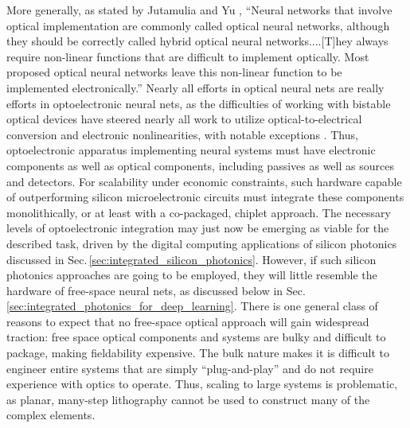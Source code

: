 More generally, as stated by Jutamulia and Yu \cite{juya1996}, ``Neural networks that involve optical implementation are commonly called optical neural networks, although they should be correctly called hybrid optical neural networks....[T]hey always require non-linear functions that are difficult to implement optically. Most proposed optical neural networks leave this non-linear function to be implemented electronically.'' Nearly all efforts in optical neural nets are really efforts in optoelectronic neural nets, as the difficulties of working with bistable optical devices \cite{ke1985} have steered nearly all work to utilize optical-to-electrical conversion and electronic nonlinearities, with notable exceptions \cite{prsh2017,more_refs_here}. Thus, optoelectronic apparatus implementing neural systems must have electronic components as well as optical components, including passives as well as sources and detectors. For scalability under economic constraints, such hardware capable of outperforming silicon microelectronic circuits must integrate these components monolithically, or at least with a co-packaged, chiplet approach. The necessary levels of optoelectronic integration may just now be emerging as viable for the described task, driven by the digital computing applications of silicon photonics discussed in Sec.\,\ref{sec:integrated_silicon_photonics}. However, if such silicon photonics approaches are going to be employed, they will little resemble the hardware of free-space neural nets, as discussed below in Sec.\,\ref{sec:integrated_photonics_for_deep_learning}. There is one general class of reasons to expect that no free-space optical approach will gain widespread traction: free space optical components and systems are bulky and difficult to package, making fieldability expensive. The bulk nature makes it is difficult to engineer entire systems that are simply ``plug-and-play'' and do not require experience with optics to operate. Thus, scaling to large systems is problematic, as planar, many-step lithography cannot be used to construct many of the complex elements.

